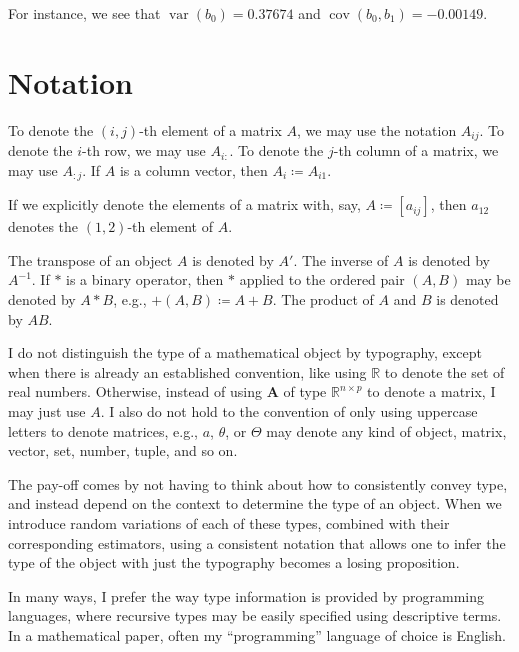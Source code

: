 \documentclass[
]{article}
\begin{document}
For instance, we see that \(\operatorname{var}(b_0) = 0.37674\) and
\(\operatorname{cov}(b_0,b_1) = -0.00149\).

\hypertarget{notation}{%
\section{Notation}\label{notation}}

\label{sec:notation} To denote the \((i,j)\)-th element of a matrix
\(A\), we may use the notation \(A_{i j}\). To denote the \(i\)-th row,
we may use \(A_{i:}\). To denote the \(j\)-th column of a matrix, we may
use \(A_{:j}\). If \(A\) is a column vector, then
\(A_i \coloneqq A_{i 1}\).

If we explicitly denote the elements of a matrix with, say,
\(A \coloneqq [a_{i j}]\), then \(a_{1 2}\) denotes the \((1,2)\)-th
element of \(A\).

The transpose of an object \(A\) is denoted by \(A'\). The inverse of
\(A\) is denoted by \(A^{-1}\). If \(*\) is a binary operator, then
\(*\) applied to the ordered pair \((A,B)\) may be denoted by \(A*B\),
e.g., \(+(A,B) \coloneqq A+B\). The product of \(A\) and \(B\) is
denoted by \(A B\).

I do not distinguish the type of a mathematical object by typography,
except when there is already an established convention, like using
\(\mathbb{R}\) to denote the set of real numbers. Otherwise, instead of
using \(\textbf{A}\) of type \(\mathbb{R}^{n \times p}\) to denote a
matrix, I may just use \(A\). I also do not hold to the convention of
only using uppercase letters to denote matrices, e.g., \(a\),
\(\theta\), or \(\Theta\) may denote any kind of object, matrix, vector,
set, number, tuple, and so on.

The pay-off comes by not having to think about how to consistently
convey type, and instead depend on the context to determine the type of
an object. When we introduce random variations of each of these types,
combined with their corresponding estimators, using a consistent
notation that allows one to infer the type of the object with just the
typography becomes a losing proposition.

In many ways, I prefer the way type information is provided by
programming languages, where recursive types may be easily specified
using descriptive terms. In a mathematical paper, often my
``programming'' language of choice is English.
\end{document}
